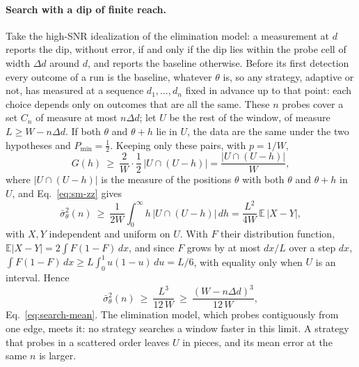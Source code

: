 \paragraph{Search with a dip of finite reach.} Take the high-SNR idealization of the elimination model: a
measurement at $d$ reports the dip, without error, if and only if the dip lies within the probe cell of width
$\Delta d$ around $d$, and reports the baseline otherwise. Before its first detection every outcome of a run is the
baseline, whatever $\theta$ is, so any strategy, adaptive or not, has measured at a sequence $d_1,\dots,d_n$ fixed
in advance up to that point: each choice depends only on outcomes that are all the same. These $n$ probes cover a set
$C_n$ of measure at most $n\Delta d$; let $U$ be the rest of the window, of measure $L\ge W-n\Delta d$. If both
$\theta$ and $\theta+h$ lie in $U$, the data are the same under the two hypotheses and $P_{\min}=\tfrac12$. Keeping
only these pairs, with $p=1/W$,
\begin{equation*}
  G(h)\ \ge\ \frac2W\cdot\frac12\,\big|U\cap(U-h)\big|=\frac{\big|U\cap(U-h)\big|}{W},
\end{equation*}
where $|U\cap(U-h)|$ is the measure of the positions $\theta$ with both $\theta$ and $\theta+h$ in $U$, and
Eq.~\eqref{eq:sm-zz} gives
\begin{equation*}
  \bar\sigma_\theta^2(n)\ \ge\ \frac{1}{2W}\int_0^\infty h\,\big|U\cap(U-h)\big|\,dh
  =\frac{L^2}{4W}\,\mathbb E\,|X-Y| ,
\end{equation*}
with $X,Y$ independent and uniform on $U$. With $F$ their distribution function,
$\mathbb E|X-Y|=2\int F(1-F)\,dx$, and since $F$ grows by at most $dx/L$ over a step $dx$,
$\int F(1-F)\,dx\ge L\int_0^1u(1-u)\,du=L/6$, with equality only when $U$ is an interval. Hence
\begin{equation*}
  \bar\sigma_\theta^2(n)\ \ge\ \frac{L^3}{12\,W}\ \ge\ \frac{(W-n\Delta d)^3}{12\,W},
\end{equation*}
Eq.~\eqref{eq:search-mean}. The elimination model, which probes contiguously from one edge, meets
it: no strategy searches a window faster in this limit. A strategy that probes in a scattered order leaves $U$ in
pieces, and its mean error at the same $n$ is larger.

